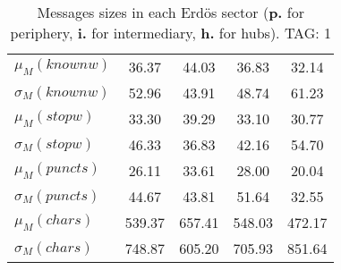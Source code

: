 \begin{table}[h!]
\begin{center}
\begin{tabular}{| l || c | c | c | c |}
$\mu_M(knownw)$ & 36.37  & 44.03  & 36.83  & 32.14 \\
$\sigma_M(knownw)$ & 52.96  & 43.91  & 48.74  & 61.23 \\\hline
$\mu_M(stopw)$ & 33.30  & 39.29  & 33.10  & 30.77 \\
$\sigma_M(stopw)$ & 46.33  & 36.83  & 42.16  & 54.70 \\\hline
$\mu_M(puncts)$ & 26.11  & 33.61  & 28.00  & 20.04 \\
$\sigma_M(puncts)$ & 44.67  & 43.81  & 51.64  & 32.55 \\\hline
$\mu_M(chars)$ & 539.37  & 657.41  & 548.03  & 472.17 \\
$\sigma_M(chars)$ & 748.87  & 605.20  & 705.93  & 851.64 \\\hline
\end{tabular}
\caption{Messages sizes in each Erd\"os sector ({{\bf p.}} for periphery, {{\bf i.}} for intermediary, {{\bf h.}} for hubs). TAG: 1}
\end{center}
\end{table}